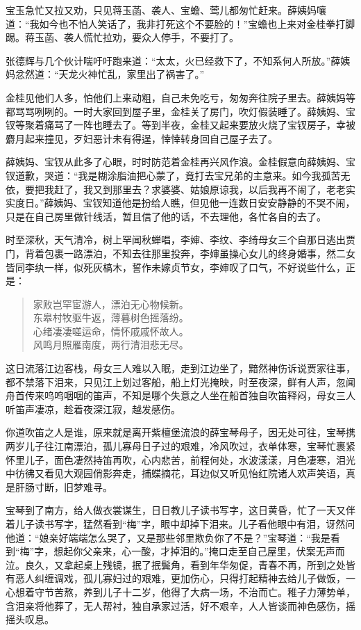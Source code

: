 \documentclass[12pt,oneside]{book}
\newenvironment{shici}{%
\begin{verse}%
\centering\large\hspace{12pt}}%
{\end{verse}}
\begin{document}
宝玉急忙又拉又劝，只见蒋玉菡、袭人、宝蟾、莺儿都匆忙赶来。薛姨妈嚷道：“我如今也不怕人笑话了，我非打死这个不要脸的！”宝蟾也上来对金桂拳打脚踢。蒋玉菡、袭人慌忙拉劝，要众人停手，不要打了。

张德辉与几个伙计喘吁吁跑来道：“太太，火已经救下了，不知系何人所放。”薛姨妈忿然道：“天龙火神忙乱，家里出了祸害了。”

金桂见他们人多，怕他们上来动粗，自己未免吃亏，匆匆奔往院子里去。薛姨妈等都骂骂咧咧的。一时大家回到屋子里，金桂关了房门，吹灯假装睡了。薛姨妈、宝钗等聚着痛骂了一阵也睡去了。等到半夜，金桂又起来要放火烧了宝钗房子，幸被麝月起来撞见，歹妇恶计未有得逞，悻悻转身回自己屋子去了。

薛姨妈、宝钗从此多了心眼，时时防范着金桂再兴风作浪。金桂假意向薛姨妈、宝钗道歉，哭道：“我是糊涂脂油把心蒙了，竟打去宝兄弟的主意来。如今我孤苦无依，要把我赶了，我又到那里去？求婆婆、姑娘原谅我，以后我再不闹了，老老实实度日。”薛姨妈、宝钗知道他是扮给人瞧，但见他一连数日安安静静的不哭不闹，只是在自己房里做针线活，暂且信了他的话，不去理他，各忙各自的去了。

时至深秋，天气清冷，树上罕闻秋蝉唱，李婶、李纹、李绮母女三个自那日逃出贾门，背着包裹一路漂泊，不知去往那里投奔，李婶虽操心女儿的终身婚事，然二女皆同李纨一样，似死灰槁木，誓作未嫁贞节女，李婶叹了口气，不好说些什么，正是：

\begin{shici}
家败岂罕宦游人，漂泊无心物候新。\\
东皋村牧驱牛返，薄暮树色摇落纷。\\
心绪凄凄嗟运命，情怀戚戚怀故人。\\
风鸣月照雁南度，两行清泪悲无尽。
\end{shici}

这日流落江边客栈，母女三人难以入眠，走到江边坐了，黯然神伤诉说贾家往事，都不禁落下泪来，只见江上划过客船，船上灯光掩映，时至夜深，鲜有人声，忽闻舟首传来呜呜咽咽的笛声，不知是哪个失意之人坐在船首独自吹笛释闷，母女三人听笛声凄凉，趁着夜深江寂，越发感伤。

你道吹笛之人是谁，原来就是离开紫檀堡流浪的薛宝琴母子，因无处可往，宝琴携两岁儿子往江南漂泊，孤儿寡母日子过的艰难，冷风吹过，衣单体寒，宝琴忙裹紧怀里儿子，面色凄然持笛再吹，心内悲苦，前程何处，水波漾漾，月色凄寒，泪光中彷彿又看见大观园俏影奔走，捕蝶摘花，耳边似又听见怡红院诸人欢声笑语，真是肝肠寸断，旧梦难寻。

宝琴到了南方，给人做衣裳谋生，日日教儿子读书写字，这日黄昏，忙了一天又伴着儿子读书写字，猛然看到“梅”字，眼中却掉下泪来。儿子看他眼中有泪，讶然问他道：“娘亲好端端怎么哭了，又是那些邻里欺负你了不是？”宝琴道：“我是看到“梅”字，想起你父亲来，心一酸，才掉泪的。”掩口走至自己屋里，伏案无声而泣。良久，又拿起桌上残镜，抿了抿鬓角，看到年华匆促，青春不再，所到之处皆有恶人纠缠调戏，孤儿寡妇过的艰难，更加伤心，只得打起精神去给儿子做饭，一心想着守节苦熬，养到儿子十二岁，他得了大病一场，不治而亡。稚子力薄势单，含泪亲将他葬了，无人帮衬，独自承家过活，好不艰辛，人人皆谈而神色感伤，摇摇头叹息。
\end{document}
